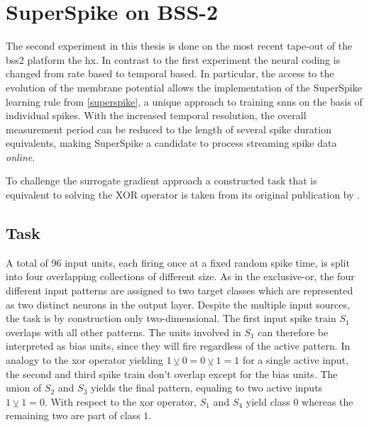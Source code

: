 \section{SuperSpike on BSS-2}

The second experiment in this thesis is done on the most recent tape-out of the \gls{bss2} platform the \gls{hx}. In contrast to the first experiment the neural coding is changed from rate based to temporal based. In particular, the access to the evolution of the membrane potential allows the implementation of the SuperSpike learning rule from \cref{superspike}, a unique approach to training \glspl{snn} on the basis of individual spikes. With the increased temporal resolution, the overall measurement period can be reduced to the length of several spike duration equivalents, making SuperSpike a candidate to process streaming spike data \emph{online}.

To challenge the surrogate gradient approach a constructed task that is equivalent to solving the XOR operator is taken from its original publication by \cite{zenke2018superspike}.

\subsection{Task}

A total of 96 input units, each firing once at a fixed random spike time, is split into four overlapping collections of different size. As in the exclusive-or, the four different input patterns are assigned to two target classes which are represented as two distinct neurons in the output layer. Despite the multiple input sources, the task is by construction only two-dimensional. The first input spike train $S_1$ overlaps with all other patterns. The units involved in $S_1$ can therefore be interpreted as bias units, since they will fire regardless of the active pattern. In analogy to the xor operator yielding $1 \veebar 0 = 0 \veebar 1 = 1$ for a single active input, the second and third spike train don't overlap except for the bias units. The union of $S_2$ and $S_3$ yields the final pattern, equaling to two active inputs $1 \veebar 1 = 0$. With respect to the xor operator, $S_1$ and $S_4$ yield class $0$ whereas the remaining two are part of class $1$.

